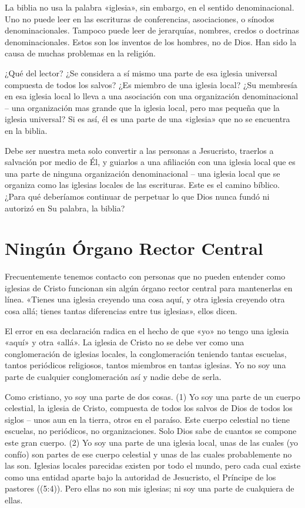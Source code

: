 \documentclass[12pt, twoside, openright]{book}
\begin{document}
La biblia no usa la palabra «iglesia», sin embargo, en el sentido denominacional. Uno no puede leer en las escrituras de conferencias, asociaciones, o sínodos denominacionales. Tampoco puede leer de jerarquías, nombres, credos o doctrinas denominacionales. Estos son los inventos de los hombres, no de Dios. Han sido la causa de muchas problemas en la religión.

¿Qué del lector? ¿Se considera a sí mismo una parte de esa iglesia universal compuesta de todos los salvos? ¿Es miembro de una iglesia local? ¿Su membresía en esa iglesia local lo lleva a una asociación con una organización denominacional – una organización mas grande que la iglesia local, pero mas pequeña que la iglesia universal? Si es así, él es una parte de una «iglesia» que no se encuentra en la biblia. 

Debe ser nuestra meta solo convertir a las personas a Jesucristo, traerlos a salvación por medio de Él, y guiarlos a una afiliación con una iglesia local que es una parte de ninguna organización denominacional – una iglesia local que se organiza como las iglesias locales de las escrituras. Este es el camino bíblico. ¿Para qué deberíamos continuar de perpetuar lo que Dios nunca fundó ni autorizó en Su palabra, la biblia?

\section{Ningún Órgano Rector Central}
Frecuentemente tenemos contacto con personas que no pueden entender como iglesias de Cristo funcionan sin algún órgano rector central para mantenerlas en línea. «Tienes una iglesia creyendo una cosa aquí, y otra iglesia creyendo otra cosa allá; tienes tantas diferencias entre tus iglesias», ellos dicen.

El error en esa declaración radica en el hecho de que «yo» no tengo una iglesia «aquí» y otra «allá». La iglesia de Cristo no se debe ver como una conglomeración de iglesias locales, la conglomeración teniendo tantas escuelas, tantos periódicos religiosos, tantos miembros en tantas iglesias. Yo no soy una parte de cualquier conglomeración así y nadie debe de serla. 

Como cristiano, yo soy una parte de dos cosas. (1) Yo soy una parte de un cuerpo celestial, la iglesia de Cristo, compuesta de todos los salvos de Dios de todos los siglos – unos aun en la tierra, otros en el paraíso. Este cuerpo celestial no tiene escuelas, no periódicos, no organizaciones. Solo Dios sabe de cuantos se compone este gran cuerpo. (2) Yo soy una parte de una iglesia local, unas de las cuales (yo confío) son partes de ese cuerpo celestial y unas de las cuales probablemente no las son. Iglesias locales parecidas existen por todo el mundo, pero cada cual existe como una entidad aparte bajo la autoridad de Jesucristo, el Príncipe de los pastores ((5:4)). Pero ellas no son mis iglesias; ni soy una parte de cualquiera de ellas. 
\end{document}
